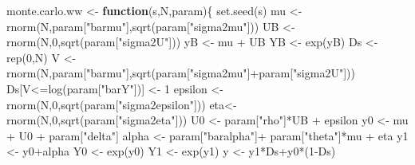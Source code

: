 \documentclass[
]{book}
\newenvironment{Shaded}{\begin{snugshade}}{\end{snugshade}}
\newcommand{\ControlFlowTok}[1]{\textcolor[rgb]{0.13,0.29,0.53}{\textbf{#1}}}
\newcommand{\DecValTok}[1]{\textcolor[rgb]{0.00,0.00,0.81}{#1}}
\newcommand{\FunctionTok}[1]{\textcolor[rgb]{0.00,0.00,0.00}{#1}}
\newcommand{\NormalTok}[1]{#1}
\newcommand{\OtherTok}[1]{\textcolor[rgb]{0.56,0.35,0.01}{#1}}
\newcommand{\SpecialCharTok}[1]{\textcolor[rgb]{0.00,0.00,0.00}{#1}}
\newcommand{\StringTok}[1]{\textcolor[rgb]{0.31,0.60,0.02}{#1}}
\theoremstyle{definition}
\theoremstyle{definition}
\theoremstyle{definition}
\theoremstyle{definition}
\theoremstyle{remark}
\begin{document}
\begin{Shaded}
\begin{Highlighting}[]
\NormalTok{monte.carlo.ww }\OtherTok{\textless{}{-}} \ControlFlowTok{function}\NormalTok{(s,N,param)\{}
  \FunctionTok{set.seed}\NormalTok{(s)}
\NormalTok{  mu }\OtherTok{\textless{}{-}} \FunctionTok{rnorm}\NormalTok{(N,param[}\StringTok{"barmu"}\NormalTok{],}\FunctionTok{sqrt}\NormalTok{(param[}\StringTok{"sigma2mu"}\NormalTok{]))}
\NormalTok{  UB }\OtherTok{\textless{}{-}} \FunctionTok{rnorm}\NormalTok{(N,}\DecValTok{0}\NormalTok{,}\FunctionTok{sqrt}\NormalTok{(param[}\StringTok{"sigma2U"}\NormalTok{]))}
\NormalTok{  yB }\OtherTok{\textless{}{-}}\NormalTok{ mu }\SpecialCharTok{+}\NormalTok{ UB }
\NormalTok{  YB }\OtherTok{\textless{}{-}} \FunctionTok{exp}\NormalTok{(yB)}
\NormalTok{  Ds }\OtherTok{\textless{}{-}} \FunctionTok{rep}\NormalTok{(}\DecValTok{0}\NormalTok{,N)}
\NormalTok{  V }\OtherTok{\textless{}{-}} \FunctionTok{rnorm}\NormalTok{(N,param[}\StringTok{"barmu"}\NormalTok{],}\FunctionTok{sqrt}\NormalTok{(param[}\StringTok{"sigma2mu"}\NormalTok{]}\SpecialCharTok{+}\NormalTok{param[}\StringTok{"sigma2U"}\NormalTok{]))}
\NormalTok{  Ds[V}\SpecialCharTok{\textless{}=}\FunctionTok{log}\NormalTok{(param[}\StringTok{"barY"}\NormalTok{])] }\OtherTok{\textless{}{-}} \DecValTok{1} 
\NormalTok{  epsilon }\OtherTok{\textless{}{-}} \FunctionTok{rnorm}\NormalTok{(N,}\DecValTok{0}\NormalTok{,}\FunctionTok{sqrt}\NormalTok{(param[}\StringTok{"sigma2epsilon"}\NormalTok{]))}
\NormalTok{  eta}\OtherTok{\textless{}{-}} \FunctionTok{rnorm}\NormalTok{(N,}\DecValTok{0}\NormalTok{,}\FunctionTok{sqrt}\NormalTok{(param[}\StringTok{"sigma2eta"}\NormalTok{]))}
\NormalTok{  U0 }\OtherTok{\textless{}{-}}\NormalTok{ param[}\StringTok{"rho"}\NormalTok{]}\SpecialCharTok{*}\NormalTok{UB }\SpecialCharTok{+}\NormalTok{ epsilon}
\NormalTok{  y0 }\OtherTok{\textless{}{-}}\NormalTok{ mu }\SpecialCharTok{+}\NormalTok{  U0 }\SpecialCharTok{+}\NormalTok{ param[}\StringTok{"delta"}\NormalTok{]}
\NormalTok{  alpha }\OtherTok{\textless{}{-}}\NormalTok{ param[}\StringTok{"baralpha"}\NormalTok{]}\SpecialCharTok{+}\NormalTok{  param[}\StringTok{"theta"}\NormalTok{]}\SpecialCharTok{*}\NormalTok{mu }\SpecialCharTok{+}\NormalTok{ eta}
\NormalTok{  y1 }\OtherTok{\textless{}{-}}\NormalTok{ y0}\SpecialCharTok{+}\NormalTok{alpha}
\NormalTok{  Y0 }\OtherTok{\textless{}{-}} \FunctionTok{exp}\NormalTok{(y0)}
\NormalTok{  Y1 }\OtherTok{\textless{}{-}} \FunctionTok{exp}\NormalTok{(y1)}
\NormalTok{  y }\OtherTok{\textless{}{-}}\NormalTok{ y1}\SpecialCharTok{*}\NormalTok{Ds}\SpecialCharTok{+}\NormalTok{y0}\SpecialCharTok{*}\NormalTok{(}\DecValTok{1}\SpecialCharTok{{-}}\NormalTok{Ds)}

\end{Highlighting}
\end{Shaded}
\end{document}

